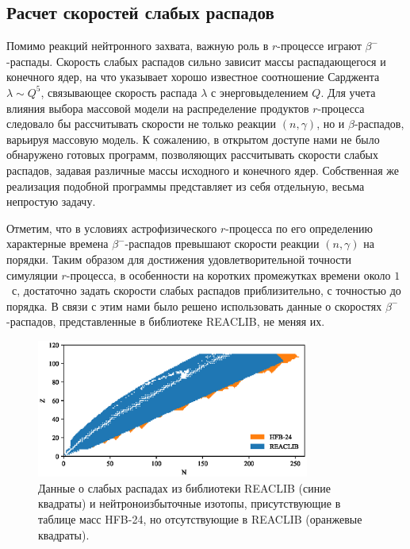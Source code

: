 \subsection{Расчет скоростей слабых распадов} \label{sec:weakfit}

  Помимо реакций нейтронного захвата, важную роль в $r$-процессе играют $\beta^-$-распады. Скорость слабых распадов сильно зависит массы распадающегося и конечного ядер, на что указывает хорошо известное соотношение Сарджента $\lambda \sim Q^5$, связывающее скорость распада $\lambda$ с энерговыделением $Q$. Для учета влияния выбора массовой модели на распределение продуктов $r$-процесса следовало бы рассчитывать скорости не только реакции $(n,\gamma)$, но и $\beta$-распадов, варьируя массовую модель. К сожалению, в открытом доступе нами не было обнаружено готовых программ, позволяющих рассчитывать скорости слабых распадов, задавая различные массы исходного и конечного ядер. Собственная же реализация подобной программы представляет из себя отдельную, весьма непростую задачу.

  Отметим, что в условиях астрофизического $r$-процесса по его определению характерные времена $\beta^-$-распадов превышают скорости реакции $(n,\gamma)$ на порядки. Таким образом для достижения удовлетворительной точности симуляции $r$-процесса, в особенности на коротких промежутках времени около $1$~с, достаточно задать скорости слабых распадов приблизительно, с точностью до порядка. В связи с этим нами было решено использовать данные о скоростях $\beta^-$-распадов, представленные в библиотеке REACLIB, не меняя их.

\begin{figure}[b!]
  \centering
  \includegraphics[width=0.8\textwidth]{pics/chart_weak_comparison.eps}
  \caption{Данные о слабых распадах из библиотеки REACLIB (синие квадраты) и нейтроноизбыточные изотопы, присутствующие в таблице масс HFB-24, но отсутствующие в REACLIB (оранжевые квадраты).}
  \label{img:weak_comparison}
\end{figure}

